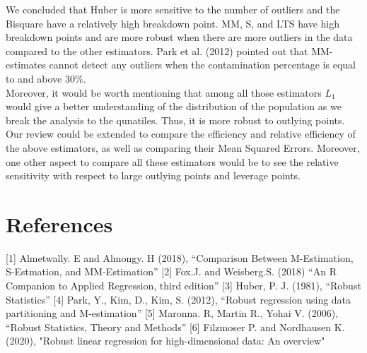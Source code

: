 \documentclass[conference]{IEEEtran}
\begin{document}
We concluded that Huber is more sensitive to the number of outliers and the Bisquare have a relatively high breakdown point. MM, S, and LTS have high breakdown points and are more robust when there are more outliers in the data compared to the other estimators. Park et al. (2012) pointed out that MM-estimates cannot detect any outliers when the contamination percentage is equal to and above 30\%.\\
Moreover, it would be worth mentioning that among all those estimators $L_1$ would give a better understanding of the distribution of the population as we break the analysis to the qunatiles. Thus, it is more robust to outlying points.\\

Our review could be extended to compare the efficiency and relative efficiency of the above estimators, as well as comparing their Mean Squared Errors. Moreover, one other aspect to compare all these estimators would be to see the relative sensitivity with respect to large outlying points and leverage points.\\

\section{References}
\bibitem{}
[1] Almetwally. E and Almongy. H (2018),
\newblock “Comparison Between M-Estimation, S-Estmation, and MM-Estimation”
\bibitem{}
[2] Fox.J. and Weisberg.S.  (2018)
\newblock “An R Companion to Applied Regression, third edition”
\bibitem{}
[3] Huber, P. J. (1981),
\newblock “Robust Statistics”
\bibitem{}
[4] Park, Y., Kim, D., Kim, S. (2012),
\newblock “Robust regression using data partitioning and M-estimation”
\bibitem{}
[5] Maronna. R, Martin R., Yohai V. (2006),
\newblock “Robust Statistics, Theory and Methods”
\bibitem{}
[6] Filzmoser P. and Nordhausen K. (2020),
\newblock "Robust linear regression for high-dimensional data: An overview"


\bibitem{}
\end{document}
